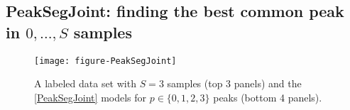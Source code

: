 \documentclass{article} %
\DeclareMathOperator*{\argmin}{arg\,min}
\begin{document}
  



\subsection{PeakSegJoint: finding the best common peak in $0,\dots, S$
  samples}

\begin{figure}[b!]
  \centering
  \texttt{[image: figure-PeakSegJoint]}
  \vskip -0.5cm
  \caption{A labeled data set with $S=3$ samples (top 3 panels) and
    the \ref{PeakSegJoint} models for $p\in\{0, 1, 2, 3\}$ peaks
    (bottom 4 panels).
}
  \label{fig:PeakSegJoint}
\end{figure}
\end{document}
